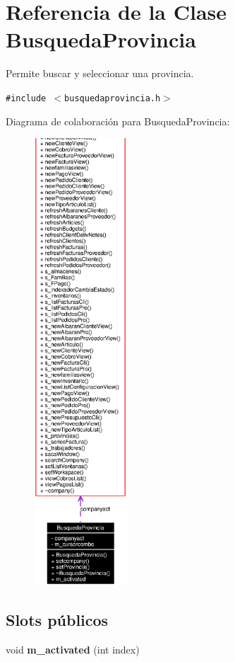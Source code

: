 \section{Referencia de la Clase Busqueda\-Provincia}
\label{classBusquedaProvincia}
Permite buscar y seleccionar una provincia.  


{\tt \#include $<$busquedaprovincia.h$>$}

Diagrama de colaboraci\'{o}n para Busqueda\-Provincia:\begin{figure}[H]
\begin{center}
\leavevmode
\includegraphics[width=99pt]{classBusquedaProvincia__coll__graph}
\end{center}
\end{figure}
\subsection*{Slots p\'{u}blicos}
\begin{CompactItemize}
\item 
void {\bf m\_\-activated} (int index)\label{classBusquedaProvincia_i0}

\end{CompactItemize}
